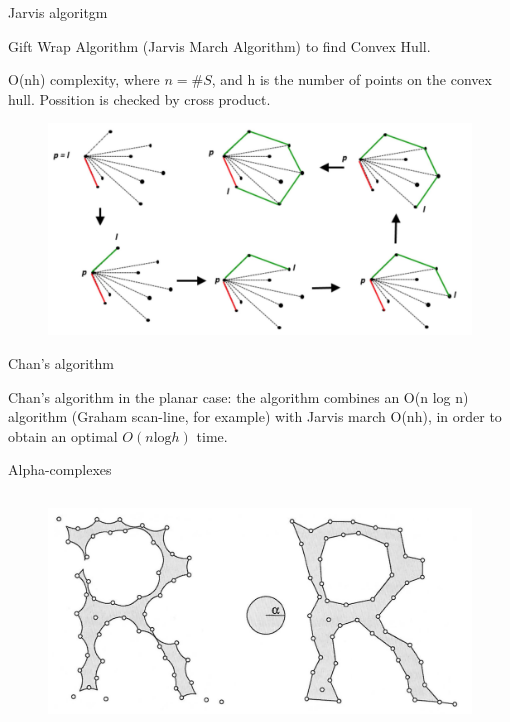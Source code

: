 \begin{frame}{Jarvis algoritgm\cite{Jarvis1973}}

    Gift Wrap Algorithm (Jarvis March Algorithm) to find Convex Hull. 
    
    O(nh) complexity, where $n = \#S$, and h is the number of points on the
convex hull. Possition is checked by cross product.
        \begin{figure}
            \centering
            \includegraphics[width=\textwidth]{figs/L14-jarvis-algorithm.jpg}
        \end{figure}
\end{frame}

\begin{frame}{Chan's algorithm\cite{Chan1996}}

Chan’s algorithm in the planar case: the algorithm combines an O(n log n)
algorithm (Graham scan-line, for example) with Jarvis march O(nh), in
order to obtain an optimal $O(n \mathrm{log} h)$ time.

    
\end{frame}

\begin{frame}{Alpha-complexes \cite{Edelsbrunner2010}}
    \begin{columns}
        \begin{figure}
            \centering
            \includegraphics[width=\textwidth]{figs/L14-alpha-hull-alpha-shape.jpg}
        \end{figure}
        
    \end{columns}
\end{frame}

